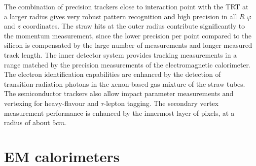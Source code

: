 The combination of precision trackers close to interaction point with the TRT at a larger radius gives very
robust pattern recognition and high precision in all $R$ $\varphi$ and $z$ coordinates. The straw hits at the
outer radius contribute significantly to the momentum measurement, since the lower precision per
point compared to the silicon is compensated by the large number of measurements and longer
measured track length.
The inner detector system provides tracking measurements in a range matched by the precision measurements of the electromagnetic calorimeter. The electron identification capabilities
are enhanced by the detection of transition-radiation photons in the xenon-based gas mixture of
the straw tubes. The semiconductor trackers also allow impact parameter measurements and vertexing for heavy-flavour and $\tau$-lepton tagging. The secondary vertex measurement performance is enhanced by the innermost layer of pixels, at a radius of about $5 cm$.


\section{EM calorimeters}
\label{sec:ATLAS_EM_calo}

\begin{figure}
\end{figure}


